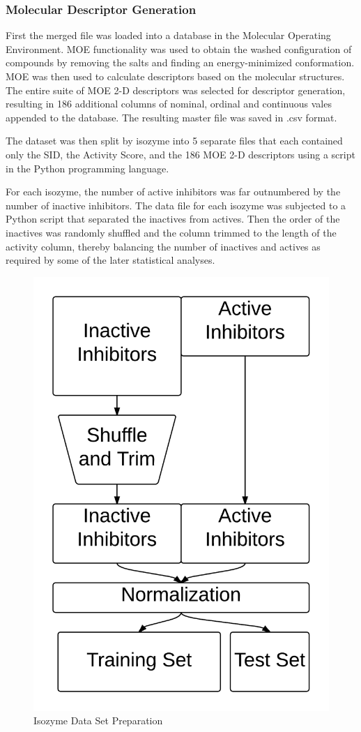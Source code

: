 \subsubsection{Molecular Descriptor Generation}
First the merged file was loaded into a database in the Molecular Operating Environment. MOE functionality was used to obtain the washed configuration of compounds by removing the salts and finding an energy-minimized conformation. MOE was then used to calculate descriptors based on the molecular structures. The entire suite of MOE 2-D descriptors was selected for descriptor generation, resulting in 186 additional columns of nominal, ordinal and continuous vales appended to the database. The resulting master file was saved in .csv format.

The dataset was then split by isozyme into 5 separate files that each contained only the SID, the Activity Score, and the 186 MOE 2-D descriptors using a script in the Python programming language.

For each isozyme, the number of active inhibitors was far outnumbered by the number of inactive inhibitors. The data file for each isozyme was subjected to a Python script that separated the inactives from actives. Then the order of the inactives was randomly shuffled and the column trimmed to the length of the activity column, thereby balancing the number of inactives and actives as required by some of the later statistical analyses. 

\begin{figure}[H]
  \centering
   \includegraphics[width=.6\textwidth]{../img/Isozyme_Data_Prep.png}
  \caption{Isozyme Data Set Preparation}
\end{figure}

